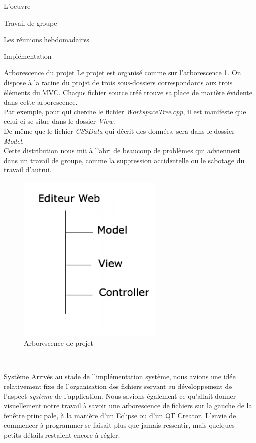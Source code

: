 \documentclass[a4paper, 12pt]{report}
\begin{document}
\begin{part}{L'oeuvre}
\begin{chapter}{Travail de groupe}
\begin{section}{Les réunions hebdomadaires}
			\end{section}
		\end{chapter}
		\begin{chapter}{Implémentation}
			\begin{section}{Arborescence du projet}
				Le projet est organisé comme sur l'arborescence \ref{dindon}. On dispose à la racine du projet de trois sous-dossiers correspondants
				aux trois éléments du \gls{MVC}. Chaque fichier source créé trouve sa place de manière évidente dans cette arborescence.\\
				Par exemple, pour qui cherche le fichier \emph{WorkspaceTree.cpp}, il est manifeste que celui-ci se situe dans le dossier \emph{View}.
				\\
				De même que le fichier \emph{CSSData} qui décrit des données, sera dans le dossier \emph{Model}.\\
				Cette distribution nous mit à l'abri de beaucoup de problèmes qui adviennent dans un travail de groupe, comme la suppression
				accidentelle ou le sabotage du travail d'autrui.\\

				\begin{figure}[h]
					\begin{center}
						\includegraphics[width=7cm]{images/arborescenceProjet.png}
						\caption{Arborescence de projet}
						\label{dindon}
					\end{center}
				\end{figure}~\\
			\end{section}
			\begin{section}{Système}
			\label{calebasse}
				Arrivés au stade de l'implémentation système, nous avions une idée relativement fixe de l'organisation des fichiers servant au
				développement de l'aspect \emph{système} de l'application. Nous savions également ce qu'allait donner visuellement notre travail
				à savoir une arborescence de fichiers sur la gauche de la fenêtre principale, à la manière d'un Eclipse ou d'un QT Creator.
				L'envie de commencer à programmer se faisait plus que jamais ressentir, mais quelques petits détails restaient encore à régler.\\



\end{section}
\end{chapter}
\end{part}
\end{document}
